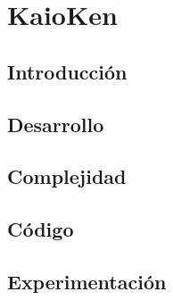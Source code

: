 \section{KaioKen}

	\subsection{Introducción}

	
    \subsection{Desarrollo}


    \subsection{Complejidad}


    \subsection{Código}


    \subsection{Experimentación}